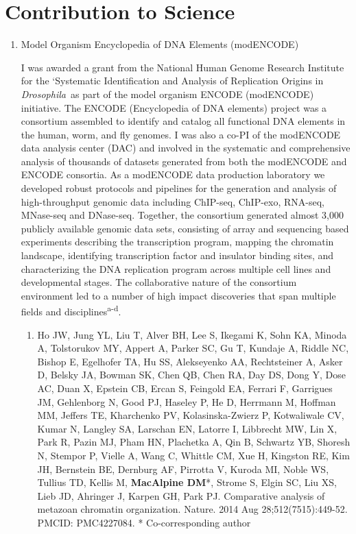 \documentclass{nihbiosketch}
\newcommand\dros{{\itshape Drosophila}\xspace}
\begin{document}

\section{Contribution to Science}

\begin{enumerate}


\item Model Organism Encyclopedia of DNA Elements (modENCODE)

I was awarded a grant from the National Human Genome Research Institute for the ‘Systematic Identification and Analysis of Replication Origins in \dros\ as part of the model organism ENCODE (modENCODE) initiative. The ENCODE (Encyclopedia of DNA elements) project was a consortium assembled to identify and catalog all functional DNA elements in the human, worm, and fly genomes. I was also a co-PI of the modENCODE data analysis center (DAC) and involved in the systematic and comprehensive analysis of thousands of datasets generated from both the modENCODE and ENCODE consortia.  As a modENCODE data production laboratory we developed robust protocols and pipelines for the generation and analysis of high-throughput genomic data including ChIP-seq, ChIP-exo, RNA-seq, MNase-seq and DNase-seq.  Together, the consortium generated almost 3,000 publicly available genomic data sets, consisting of array and sequencing based experiments describing the transcription program, mapping the chromatin landscape, identifying transcription factor and insulator binding sites, and characterizing the DNA replication program across multiple cell lines and developmental stages.  The collaborative nature of the consortium environment led to a number of high impact discoveries that span multiple fields and disciplines\textsuperscript{a-d}.

  
\begin{enumerate}
\setlength\itemsep{0.35em}

\item Ho JW, Jung YL, Liu T, Alver BH, Lee S, Ikegami K, Sohn KA, Minoda A, Tolstorukov MY, Appert A, Parker SC, Gu T, Kundaje A, Riddle NC, Bishop E, Egelhofer TA, Hu SS, Alekseyenko AA, Rechtsteiner A, Asker D, Belsky JA, Bowman SK, Chen QB, Chen RA, Day DS, Dong Y, Dose AC, Duan X, Epstein CB, Ercan S, Feingold EA, Ferrari F, Garrigues JM, Gehlenborg N, Good PJ, Haseley P, He D, Herrmann M, Hoffman MM, Jeffers TE, Kharchenko PV, Kolasinska-Zwierz P, Kotwaliwale CV, Kumar N, Langley SA, Larschan EN, Latorre I, Libbrecht MW, Lin X, Park R, Pazin MJ, Pham HN, Plachetka A, Qin B, Schwartz YB, Shoresh N, Stempor P, Vielle A, Wang C, Whittle CM, Xue H, Kingston RE, Kim JH, Bernstein BE, Dernburg AF, Pirrotta V, Kuroda MI, Noble WS, Tullius TD, Kellis M, \textbf{MacAlpine DM}*, Strome S, Elgin SC, Liu XS, Lieb JD, Ahringer J, Karpen GH, Park PJ. Comparative analysis of metazoan chromatin organization. Nature. 2014 Aug 28;512(7515):449-52. PMCID: PMC4227084. * Co-corresponding author


\end{enumerate}
\end{enumerate}
\end{document}
